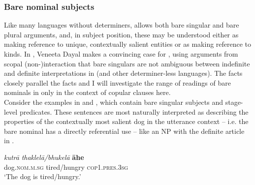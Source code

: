 \documentclass[output=paper,hidelinks]{langscibook}
\begin{document}
\begin{exe}
\judgewidth{\#}
\ex \label{indiv}
\begin{xlist}
\z
\z
{}

 \subsubsection{Bare nominal subjects}
 Like many languages without determiners,  allows both bare singular and bare plural arguments, and, in subject position, these may be understood either as making reference to unique, contextually salient entities or as making reference to kinds. In \citet{dayal1999,dayal2004}, Veneeta Dayal makes a convincing case for , using arguments from scopal (non-)interaction that bare singulars are not ambiguous between indefinite and definite interpretations in  (and other determiner-less languages). The  facts closely parallel the  facts and I will investigate the range of readings of bare nominals in  only in the context of copular clauses here.\\
 
Consider the examples in  and , which contain bare singular subjects and stage-level predicates. These sentences are most naturally interpreted as describing the properties of the contextually most salient dog in the utterance context -- i.e. the bare nominal has a directly referential use -- like an NP with the definite article in .

\ea \label{barenomstage}
\ea
\gll \emph{kutrā} \emph{thaklelā/bhukelā} \textbf{āhe}\\
dog.\textsc{nom.m.sg} tired/hungry \textsc{cop1.pres.3sg}\\
\glt `The dog is tired/hungry.'\label{barenomstagea}


\end{xlist}
\end{exe}
\end{document}
